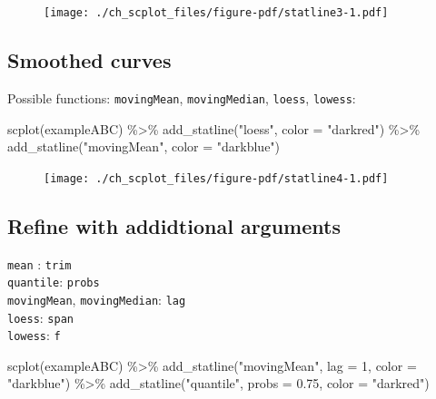 \documentclass[
  letterpaper,
  DIV=11,
  numbers=noendperiod]{scrreprt}
\newenvironment{Shaded}{\begin{snugshade}}{\end{snugshade}}
\newcommand{\AttributeTok}[1]{\textcolor[rgb]{0.40,0.45,0.13}{#1}}
\newcommand{\DecValTok}[1]{\textcolor[rgb]{0.68,0.00,0.00}{#1}}
\newcommand{\FloatTok}[1]{\textcolor[rgb]{0.68,0.00,0.00}{#1}}
\newcommand{\FunctionTok}[1]{\textcolor[rgb]{0.28,0.35,0.67}{#1}}
\newcommand{\NormalTok}[1]{\textcolor[rgb]{0.00,0.23,0.31}{#1}}
\newcommand{\SpecialCharTok}[1]{\textcolor[rgb]{0.37,0.37,0.37}{#1}}
\newcommand{\StringTok}[1]{\textcolor[rgb]{0.13,0.47,0.30}{#1}}
\begin{document}
\begin{figure}[H]

{\centering \texttt{[image: ./ch\_scplot\_files/figure-pdf/statline3-1.pdf]}

}

\end{figure}

\hypertarget{smoothed-curves}{%
\subsection{Smoothed curves}\label{smoothed-curves}}

Possible functions: \texttt{movingMean}, \texttt{movingMedian},
\texttt{loess}, \texttt{lowess}:

\begin{Shaded}
\begin{Highlighting}[]
\FunctionTok{scplot}\NormalTok{(exampleABC) }\SpecialCharTok{\%\textgreater{}\%}
  \FunctionTok{add\_statline}\NormalTok{(}\StringTok{"loess"}\NormalTok{, }\AttributeTok{color =} \StringTok{"darkred"}\NormalTok{) }\SpecialCharTok{\%\textgreater{}\%}
  \FunctionTok{add\_statline}\NormalTok{(}\StringTok{"movingMean"}\NormalTok{, }\AttributeTok{color =} \StringTok{"darkblue"}\NormalTok{)}
\end{Highlighting}
\end{Shaded}

\begin{figure}[H]

{\centering \texttt{[image: ./ch\_scplot\_files/figure-pdf/statline4-1.pdf]}

}

\end{figure}

\hypertarget{refine-with-addidtional-arguments}{%
\subsection{Refine with addidtional
arguments}\label{refine-with-addidtional-arguments}}

\texttt{mean} : \texttt{trim}\\
\texttt{quantile}: \texttt{probs}\\
\texttt{movingMean}, \texttt{movingMedian}: \texttt{lag}\\
\texttt{loess}: \texttt{span}\\
\texttt{lowess}: \texttt{f}

\begin{Shaded}
\begin{Highlighting}[]
\FunctionTok{scplot}\NormalTok{(exampleABC) }\SpecialCharTok{\%\textgreater{}\%}
  \FunctionTok{add\_statline}\NormalTok{(}\StringTok{"movingMean"}\NormalTok{, }\AttributeTok{lag =} \DecValTok{1}\NormalTok{, }\AttributeTok{color =} \StringTok{"darkblue"}\NormalTok{) }\SpecialCharTok{\%\textgreater{}\%}
  \FunctionTok{add\_statline}\NormalTok{(}\StringTok{"quantile"}\NormalTok{, }\AttributeTok{probs =} \FloatTok{0.75}\NormalTok{, }\AttributeTok{color =} \StringTok{"darkred"}\NormalTok{)}
\end{Highlighting}
\end{Shaded}
\end{document}
